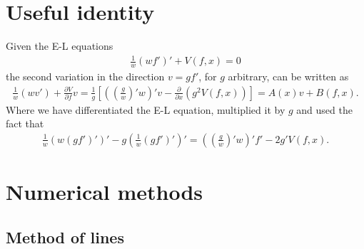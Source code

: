 \clearpage
\chapter{Useful identity}
\label{cha:Identity}

Given the E-L equations
\begin{align}
  \frac{1}{w}\left(wf'\right)'+V(f,x)=0
\end{align}
the second variation in the direction $v=gf'$, for $g$ arbitrary, can
be written as
\begin{align}\label{eq:strange_variation}
  \frac{1}{w}\left(wv'\right)+\frac{\partial V}{\partial
    f}v=\frac{1}{g}\left[\left(\left(\frac{g}{w}\right)'w
  \right)'v-\frac{\partial}{\partial x}\left(g^2 V(f,x)\right)\right]=A(x)v+B(f,x).
\end{align}
Where we have differentiated the E-L equation, multiplied it by $g$
and used the fact that
\begin{align}
  \frac{1}{w}\left(w(gf')'\right)'-g\left(\frac{1}{w}(gf')'\right)'
  =\left(\left(\frac{g}{w}\right)'w \right)'f'-2g'V(f,x).
\end{align}



\chapter{Numerical methods}
\label{cha:numerical-methods}

\section{Method of lines}
\label{sec:method-lines}

